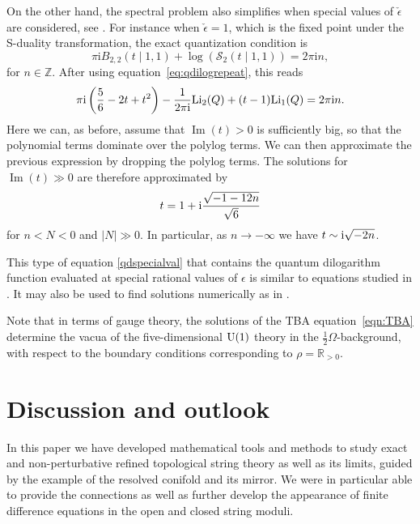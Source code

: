 \documentclass[pdftex]{sigma}
\numberwithin{equation}{section}
\begin{document}
On the other hand, the spectral problem also simplifies when special values of $\check{\epsilon}$ are considered, see \cite{GHM,MarinoSpectral}. For instance when $\check{\epsilon}=1$, which is the fixed point under the S-duality transformation, the exact quantization condition is
\begin{equation}\label{qdspecialval}
 \pi \mathrm{i} B_{2,2}(t\mid 1,1) + \log ( \mathcal{S}_2(t\mid 1,1)) = 2\pi \mathrm{i} n,
\end{equation}
for $n\in \mathbb{Z}$. After using equation~\eqref{eq:qdilogrepeat}, this reads
\begin{equation*}
 \pi \mathrm{i}\left( \frac{5}{6} -2t+t^2 \right) -\frac{1}{2\pi \mathrm{i}} {\rm Li}_2(Q)+ (t-1){\rm Li}_1(Q) = 2\pi \mathrm{i} n.
\end{equation*}
Here we can, as before, assume that $\operatorname{Im}(t)>0$ is sufficiently big, so that the polynomial terms dominate over the polylog terms. We can then approximate the previous expression by dropping the polylog terms. The solutions for $\operatorname{Im}(t)\gg 0$ are therefore approximated by
\begin{equation*}
 t=1+ {\rm i}\frac{\sqrt{-1-12n}}{\sqrt{6}}
\end{equation*}
for $n<N<0$ and $|N|\gg 0$. In particular, as $n\to -\infty$ we have $t\sim {\rm i}\sqrt{-2n}$.

This type of equation \eqref{qdspecialval} that contains the quantum dilogarithm function evaluated at special rational values of $\epsilon$ is similar to equations studied in \cite{Garoufalidisevaluation}. It may also be used to find solutions numerically as in \cite{MarinoSpectral}.

Note that in terms of gauge theory, the solutions of the TBA equation~\eqref{eqn:TBA} determine the vacua of the five-dimensional ${\rm U}(1)$ theory in the $\frac{1}{2} \Omega$-background, with respect to the boundary conditions corresponding to $\rho= \mathbb{R}_{>0}$.

\section{Discussion and outlook}\label{sec:discussion}

In this paper we have developed mathematical tools and methods to study exact and non-perturbative refined topological string theory as well as its limits, guided by the example of the resolved conifold and its mirror. We were in particular able to provide the connections as well as further develop the appearance of finite difference equations in the open and closed string moduli.
\end{document}
